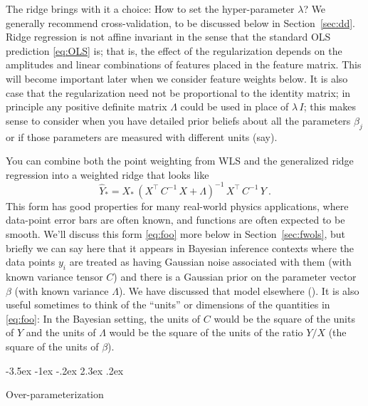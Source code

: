 \documentclass[12pt,letterpaper]{article}
\makeatletter
\renewcommand\section{\@startsection {section}{1}{\z@}%
  {-3.5ex \@plus -1ex \@minus -.2ex}%
  {2.3ex \@plus.2ex}%
  {\raggedright\normalfont\Large\bfseries}}
\newcommand{\sectionname}{Section}
\makeatother
\begin{document}
The ridge brings with it a choice: How to set the hyper-parameter $\lambda$?
We generally recommend cross-validation, to be discussed below in \sectionname~\ref{sec:dd}.
Ridge regression is not affine invariant in the sense that the standard OLS prediction \eqref{eq:OLS} is; that is, the effect of the regularization depends on the amplitudes and linear combinations of features placed in the feature matrix.
This will become important later when we consider feature weights below.
It is also case that the regularization need not be proportional to the identity matrix; in principle any positive definite matrix $\Lambda$ could be used in place of $\lambda\,I$; this makes sense to consider when you have detailed prior beliefs about all the parameters $\beta_j$ or if those parameters are measured with different units (say).

You can combine both the point weighting from WLS and the generalized ridge regression into a weighted ridge that looks like
\begin{equation}\label{eq:foo}
    \hat{Y}_\ast = X_\ast\,(X^\top\,C^{-1}\,X + \Lambda)^{-1}\,X^\top\,C^{-1}\,Y
    ~.
\end{equation}
This form has good properties for many real-world physics applications, where data-point error bars are often known, and functions are often expected to be smooth.
We'll discuss this form \eqref{eq:foo} more below in \sectionname~\ref{sec:fwols},
but briefly we can say here that it appears in Bayesian inference contexts where the data points $y_i$ are treated as having Gaussian noise associated with them (with known variance tensor $C$) and there is a Gaussian prior on the parameter vector $\beta$ (with known variance $\Lambda$).
We have discussed that model elsewhere (\citealt{products}).
It is also useful sometimes to think of the ``units'' or dimensions of the quantities in \eqref{eq:foo}: In the Bayesian setting, the units of $C$ would be the square of the units of $Y$ and the units of $\Lambda$ would be the square of the units of the ratio $Y/X$ (the square of the units of $\beta$).

\section{Over-parameterization}
\end{document}
